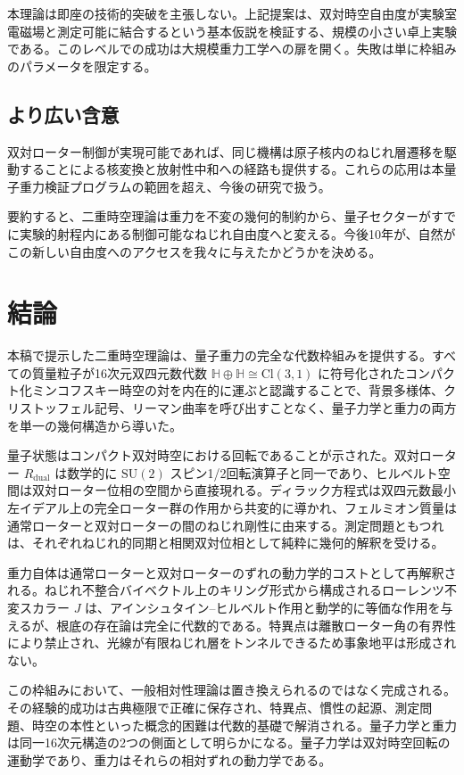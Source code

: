 \documentclass[a4paper]{article}
\begin{document}
本理論は即座の技術的突破を主張しない。上記提案は、双対時空自由度が実験室電磁場と測定可能に結合するという基本仮説を検証する、規模の小さい卓上実験である。このレベルでの成功は大規模重力工学への扉を開く。失敗は単に枠組みのパラメータを限定する。

\subsection{より広い含意}

双対ローター制御が実現可能であれば、同じ機構は原子核内のねじれ層遷移を駆動することによる核変換と放射性中和への経路も提供する。これらの応用は本量子重力検証プログラムの範囲を超え、今後の研究で扱う。

要約すると、二重時空理論は重力を不変の幾何的制約から、量子セクターがすでに実験的射程内にある制御可能なねじれ自由度へと変える。今後10年が、自然がこの新しい自由度へのアクセスを我々に与えたかどうかを決める。

\section{結論}
\label{sec:conclusions}

本稿で提示した二重時空理論は、量子重力の完全な代数枠組みを提供する。すべての質量粒子が16次元双四元数代数 $\mathbb{H} \oplus \mathbb{H} \cong \mathrm{Cl}(3,1)$ に符号化されたコンパクト化ミンコフスキー時空の対を内在的に運ぶと認識することで、背景多様体、クリストッフェル記号、リーマン曲率を呼び出すことなく、量子力学と重力の両方を単一の幾何構造から導いた。

量子状態はコンパクト双対時空における回転であることが示された。双対ローター $R_\text{dual}$ は数学的に $\mathrm{SU}(2)$ スピン1/2回転演算子と同一であり、ヒルベルト空間は双対ローター位相の空間から直接現れる。ディラック方程式は双四元数最小左イデアル上の完全ローター群の作用から共変的に導かれ、フェルミオン質量は通常ローターと双対ローターの間のねじれ剛性に由来する。測定問題ともつれは、それぞれねじれ的同期と相関双対位相として純粋に幾何的解釈を受ける。

重力自体は通常ローターと双対ローターのずれの動力学的コストとして再解釈される。ねじれ不整合バイベクトル上のキリング形式から構成されるローレンツ不変スカラー $J$ は、アインシュタイン--ヒルベルト作用と動学的に等価な作用を与えるが、根底の存在論は完全に代数的である。特異点は離散ローター角の有界性により禁止され、光線が有限ねじれ層をトンネルできるため事象地平は形成されない。

この枠組みにおいて、一般相対性理論は置き換えられるのではなく完成される。その経験的成功は古典極限で正確に保存され、特異点、慣性の起源、測定問題、時空の本性といった概念的困難は代数的基礎で解消される。量子力学と重力は同一16次元構造の2つの側面として明らかになる。量子力学は双対時空回転の運動学であり、重力はそれらの相対ずれの動力学である。
\end{document}
